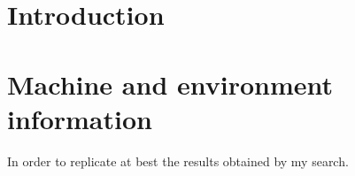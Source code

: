 \newpage
\section{Introduction}



\section{Machine and environment information}
In order to replicate at best the results obtained by my search.
